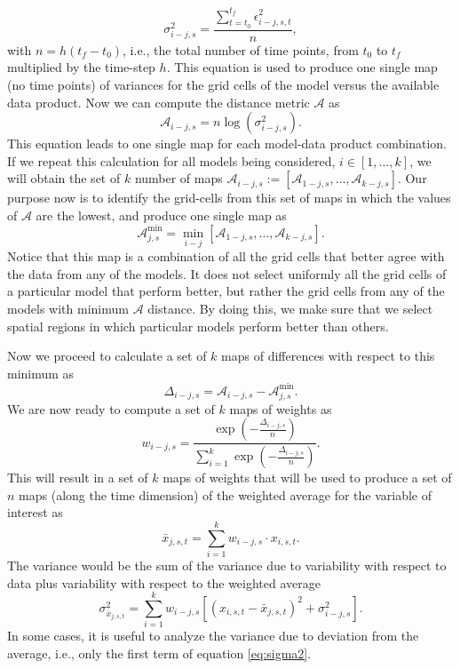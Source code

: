 \documentclass[gmd, manuscript]{copernicus}
\begin{document}
\begin{equation}
\sigma_{i-j, s}^2 = \frac{ \sum_{t=t_0}^{t_f} \epsilon_{i-j, s, t}^2 }{n},
\end{equation}
with $n = h (t_f - t_0)$, i.e., the total number of time points, from $t_0$ to $t_f$ multiplied by the time-step $h$. This equation is used to produce one single map (no time points) of variances for the grid cells of the model versus the available data product. Now we can compute  the distance metric $\mathcal{A}$ as
\begin{equation}
\mathcal{A}_{i-j, s} = n \log (\sigma_{i-j, s}^2).
\end{equation}
This equation leads to one single map for each model-data product combination. If we repeat this calculation for all models being considered, $i \in [1, \dots , k]$, we will obtain the set of $k$ number of maps $\mathcal{A}_{i-j, s} := [\mathcal{A}_{1-j, s}, \dots , \mathcal{A}_{k-j, s}] $. Our purpose now is to identify the grid-cells from this set of maps in which the values of $\mathcal{A}$ are the lowest, and produce one single map as
\begin{equation}
\mathcal{A}_{j, s}^{\min} = \min_{i-j} [\mathcal{A}_{1-j, s}, \dots , \mathcal{A}_{k-j, s}].
\end{equation}
Notice that this map is a combination of all the grid cells that better agree with the data from any of the models. It does not select uniformly all the grid cells of a particular model that perform better, but rather the grid cells from any of the models with minimum $\mathcal{A}$ distance. By doing this, we make sure that we select spatial regions in which particular models perform better than others.

Now we proceed to calculate a set of $k$ maps of differences with respect to this minimum as
\begin{equation}
\Delta_{i-j, s} = \mathcal{A}_{i-j, s} - \mathcal{A}_{j, s}^{\min}.
\end{equation}
We are now ready to compute a set of $k$ maps of weights as
\begin{equation}
w_{i-j, s} = \frac{\exp (- \frac{\Delta_{i-j, s}}{n})}{\sum_{i=1}^k \exp (- \frac{\Delta_{i-j, s}}{n}) }.
\end{equation}
This will result in a set of $k$ maps of weights that will be used to produce a set of $n$ maps (along the time dimension) of the weighted average for the variable of interest as
\begin{equation}
\bar{x}_{j, s, t} = \sum_{i=1}^{k} w_{i-j, s} \cdot x_{i, s, t}.
\end{equation}
The variance would be the sum of the variance due to variability with respect to data plus variability with respect to the weighted average
\begin{equation} \label{eq:sigma2}
\sigma_{\bar{x}_{j, s, t}}^2 =  \sum_{i=1}^k w_{i-j, s}  \left[  (x_{i, s, t} - \bar{x}_{j, s, t})^2 + \sigma_{i-j, s}^2 \right].
\end{equation}
In some cases, it is useful to analyze the variance due to deviation from the average, i.e., only the first term of equation \ref{eq:sigma2}.
\end{document}
